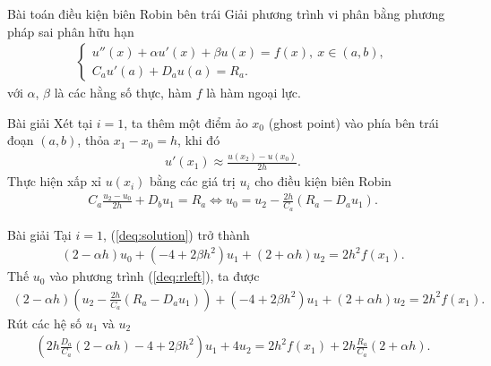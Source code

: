 \documentclass[9pt]{beamer}
\numberwithin{equation}{section}
\begin{document}
\begin{frame}
\begin{block}{Bài toán điều kiện biên Robin bên trái}
    Giải phương trình vi phân bằng phương pháp sai phân hữu hạn
    \begin{align*}
        \begin{cases}
        u''(x) + \alpha u'(x) + \beta u(x) = f(x), \ x \in (a,b), \\
        C_a u'(a) + D_a u(a) = R_a.
        \end{cases}
    \end{align*}
    với $\alpha$, $\beta$ là các hằng số thực, hàm $f$ là hàm ngoại lực.
\end{block}

\begin{exampleblock}{Bài giải}
    Xét tại $i = 1$, ta thêm một điểm ảo $x_0$ (ghost point) vào phía bên trái đoạn $(a,b)$, thỏa $x_1 - x_0 = h$, khi đó
    \begin{align*}
        u'(x_1) \approx \frac{u(x_2) - u(x_0)}{2h}.
    \end{align*}
    Thực hiện xấp xỉ $u(x_i)$ bằng các giá trị $u_i$ cho điều kiện biên Robin
    \begin{align*}
        C_a \frac{u_2 - u_0}{2h} + D_b u_1 = R_a
        \Leftrightarrow u_0 = u_2 - \frac{2h}{C_a}(R_a - D_a u_1).
    \end{align*}
\end{exampleblock}
\end{frame}

\begin{frame}
\begin{exampleblock}{Bài giải}
    Tại $i = 1$, (\ref{deq:solution}) trở thành
    \begin{align}
        (2 - \alpha h) u_0 + (-4 + 2\beta h^2) u_1 + (2 + \alpha h) u_2 = 2h^2 f(x_1). \label{deq:rleft}
    \end{align}
    Thế $u_0$ vào phương trình (\ref{deq:rleft}), ta được
    \begin{align*}
        (2 - \alpha h) \left(u_2 - \frac{2h}{C_a}(R_a - D_a u_1)\right) + (-4 + 2\beta h^2) u_1 + (2 + \alpha h) u_2 = 2h^2 f(x_1).
    \end{align*}
    Rút các hệ số $u_1$ và $u_2$
    \begin{align}
        \left(2h \frac{D_a}{C_a} (2 - \alpha h) - 4 + 2\beta h^2\right) u_1 + 4u_2 = 2h^2 f(x_1) + 2h \frac{R_a}{C_a} (2 + \alpha h). \label{deq:rl_solution}
    \end{align}
\end{exampleblock}
\end{frame}
\end{document}
